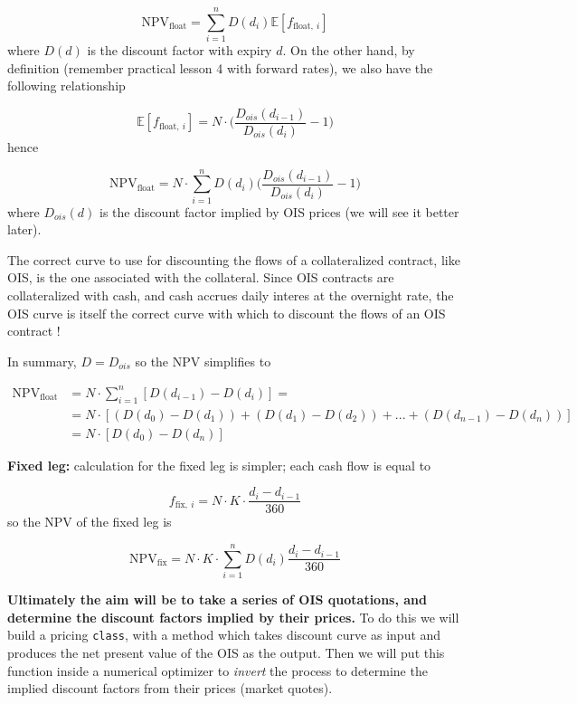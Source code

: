 \[\mathrm{NPV}_{\mathrm{float}} = \sum_{i=1}^{n}D(d_i)\mathbb{E}[f_{\mathrm{float},~i}]\]
where \(D(d)\) is the discount factor with expiry \(d\). On the other hand, by definition (remember practical lesson 4 with forward rates), we also have the following relationship

\[\mathbb{E}[f_{\mathrm{float},~i}] = N\cdot\Big(\frac{D_{ois}(d_{i-1})}{D_{ois}(d_{i})} - 1\Big) \]
hence

\[\mathrm{NPV}_{\mathrm{float}} = N\cdot \sum_{i=1}^{n}D(d_i) \Big(\frac{D_{ois}(d_{i-1})}{D_{ois}(d_{i})} - 1\Big) \]
where \(D_{ois}(d)\) is the discount factor implied by OIS prices (we will see it better later).

The correct curve to use for discounting the flows of a collateralized contract, like OIS, is the one associated with the collateral. Since OIS contracts are collateralized with cash, and cash accrues daily interes
at the overnight rate, the OIS curve is itself the correct curve with which to discount the flows of an OIS contract !

In summary, \(D = D_{ois}\) so the NPV simplifies to

\begin{equation}
  \begin{split}
    \mathrm{NPV}_{\mathrm{float}} & = N\cdot\sum_{i=1}^{n}[D(d_{i-1}) - D(d_i)] =  \\
    &= N\cdot[(D(d_{0}) - D(d_{1})) + (D(d_{1}) - D(d_{2})) + ... + (D(d_{n-1}) - D(d_{n}))]\\
    &= N \cdot [D(d_0) - D(d_n)]
  \end{split}
\end{equation}

\textbf{Fixed leg:} calculation for the fixed leg is simpler; each cash flow is  equal to

\[f_{\mathrm{fix},~i}=N\cdot K\cdot \frac{d_i - d_{i-1}}{360}\]
so the NPV of the fixed leg is

\[\mathrm{NPV}_{\mathrm{fix}} = N\cdot K\cdot \sum_{i=1}^{n}D(d_{i})\frac{d_i - d_{i-1}}{360}\]

\textbf{Ultimately the aim will be to take a series of OIS quotations, and determine the discount factors implied by their prices.} To do this we will build a pricing \texttt{class}, with a method which takes discount curve as input and produces the net present value of the OIS as the output.
Then we will put this function inside a numerical optimizer to \emph{invert} the process to determine the implied discount factors from their prices (market quotes).

